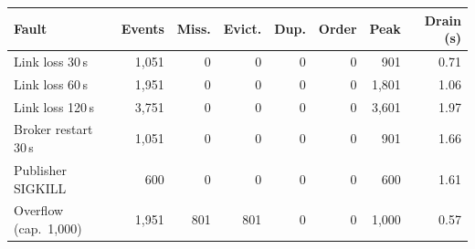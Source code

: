 \begin{tabular}{@{}lrrrrrrr@{}}
\toprule
Fault & Events & Miss. & Evict. & Dup. & Order & Peak & Drain (s) \\
\midrule
Link loss 30\,s & 1{,}051 & 0 & 0 & 0 & 0 & 901 & 0.71 \\
Link loss 60\,s & 1{,}951 & 0 & 0 & 0 & 0 & 1{,}801 & 1.06 \\
Link loss 120\,s & 3{,}751 & 0 & 0 & 0 & 0 & 3{,}601 & 1.97 \\
Broker restart 30\,s & 1{,}051 & 0 & 0 & 0 & 0 & 901 & 1.66 \\
Publisher SIGKILL & 600 & 0 & 0 & 0 & 0 & 600 & 1.61 \\
Overflow (cap.\ 1{,}000) & 1{,}951 & 801 & 801 & 0 & 0 & 1{,}000 & 0.57 \\
\bottomrule
\end{tabular}
